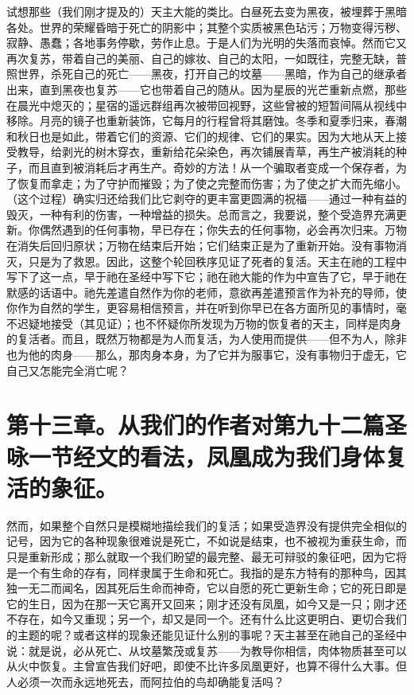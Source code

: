试想那些（我们刚才提及的）天主大能的类比。白昼死去变为黑夜，被埋葬于黑暗各处。世界的荣耀昏暗于死亡的阴影中；其整个实质被黑色玷污；万物变得污秽、寂静、愚蠢；各地事务停歇，劳作止息。于是人们为光明的失落而哀悼。然而它又再次复苏，带着自己的美丽、自己的嫁妆、自己的太阳，一如既往，完整无缺，普照世界，杀死自己的死亡——黑夜，打开自己的坟墓——黑暗，作为自己的继承者出来，直到黑夜也复苏——它也带着自己的随从。因为星辰的光芒重新点燃，那些在晨光中熄灭的；星宿的遥远群组再次被带回视野，这些曾被的短暂间隔从视线中移除。月亮的镜子也重新装饰，它每月的行程曾将其磨蚀。冬季和夏季归来，春潮和秋日也是如此，带着它们的资源、它们的规律、它们的果实。因为大地从天上接受教导，给剥光的树木穿衣，重新给花朵染色，再次铺展青草，再生产被消耗的种子，而且直到被消耗后才再生产。奇妙的方法！从一个骗取者变成一个保存者，为了恢复而拿走；为了守护而摧毁；为了使之完整而伤害；为了使之扩大而先缩小。（这个过程）确实归还给我们比它剥夺的更丰富更圆满的祝福——通过一种有益的毁灭，一种有利的伤害，一种增益的损失。总而言之，我要说，整个受造界充满更新。你偶然遇到的任何事物，早已存在；你失去的任何事物，必会再次归来。万物在消失后回归原状；万物在结束后开始；它们结束正是为了重新开始。没有事物消灭，只是为了救恩。因此，这整个轮回秩序见证了死者的复活。天主在祂的工程中写下了这一点，早于祂在圣经中写下它；祂在祂大能的作为中宣告了它，早于祂在默感的话语中。祂先差遣自然作为你的老师，意欲再差遣预言作为补充的导师，使你作为自然的学生，更容易相信预言，并在听到你早已在各方面所见的事情时，毫不迟疑地接受（其见证）；也不怀疑你所发现为万物的恢复者的天主，同样是肉身的复活者。而且，既然万物都是为人而复活，为人使用而提供——但不为人，除非也为他的肉身——那么，那肉身本身，为了它并为服事它，没有事物归于虚无，它自己又怎能完全消亡呢？\par


\section{第十三章。从我们的作者对第九十二篇圣咏一节经文的看法，凤凰成为我们身体复活的象征。}

然而，如果整个自然只是模糊地描绘我们的复活；如果受造界没有提供完全相似的记号，因为它的各种现象很难说是死亡，不如说是结束，也不被视为重获生命，而只是重新形成；那么就取一个我们盼望的最完整、最无可辩驳的象征吧，因为它将是一个有生命的存有，同样隶属于生命和死亡。我指的是东方特有的那种鸟，因其独一无二而闻名，因其死后生命而神奇，它以自愿的死亡更新生命；它的死日即是它的生日，因为在那一天它离开又回来；刚才还没有凤凰，如今又是一只；刚才还不存在，如今又重现；另一个，却又是同一个。还有什么比这更明白、更切合我们的主题的呢？或者这样的现象还能见证什么别的事呢？天主甚至在祂自己的圣经中说：就是说，必从死亡、从坟墓繁茂或复苏——为教导你相信，肉体物质甚至可以从火中恢复。主曾宣告我们好吧，即使不比许多凤凰更好，也算不得什么大事。但人必须一次而永远地死去，而阿拉伯的鸟却确能复活吗？\par

